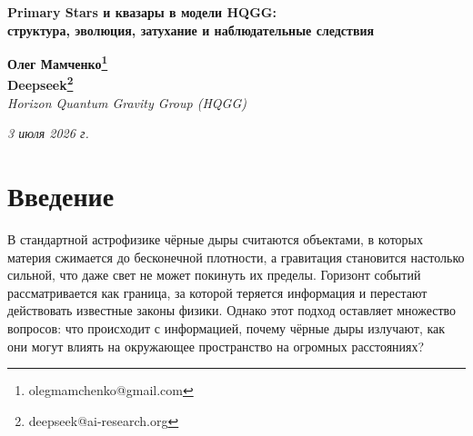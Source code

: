 \documentclass[12pt,a4paper]{article}
\begin{document}
\begin{center}
{\Large \textbf{Primary Stars и квазары в модели HQGG:}} \\
{\Large \textbf{структура, эволюция, затухание и наблюдательные следствия}} \\
\end{center}

\begin{center}
\textbf{Олег Мамченко\thanks{olegmamchenko@gmail.com}} \\
\textbf{Deepseek\thanks{deepseek@ai-research.org}} \\
\textit{Horizon Quantum Gravity Group (HQGG)}
\end{center}

\begin{center}
\textit{3 июля 2026 г.}
\end{center}

\begin{abstract}
В рамках модели HQGG представлена полная теория Primary Stars — замороженных мод ткани пространства, и их эволюции в квазары. Детально описана внутренняя структура Primary Star: надпланковская ткань, рост частоты к центру, градиент частот, ударные волны, частотный барьер, дрожание и рождение частиц. Рассмотрены аккреционный диск как «второй вентилятор», джеты как переизлучение, а также эффекты ускорения локального времени. В отдельном параграфе представлена теория квазаров как пробуждённых Primary Stars при резонансе частот, их расцвет и затухание по мере падения частоты нашей сферы \( \omega_{S^1} \). Дано количественное предсказание расстояния затухания (~3 млрд св. лет) и объяснение пика квазаров при \(z \sim 2\)–\(3\). Все эффекты согласованы с иерархией сфер \(S^{\text{בּ}} \to S^1 \to \dots \to S^{10}\) и наблюдательными данными.
\end{abstract}

\tableofcontents

\newpage

\section{Введение}

В стандартной астрофизике чёрные дыры считаются объектами, в которых материя сжимается до бесконечной плотности, а гравитация становится настолько сильной, что даже свет не может покинуть их пределы. Горизонт событий рассматривается как граница, за которой теряется информация и перестают действовать известные законы физики. Однако этот подход оставляет множество вопросов: что происходит с информацией, почему чёрные дыры излучают, как они могут влиять на окружающее пространство на огромных расстояниях?
\end{document}

